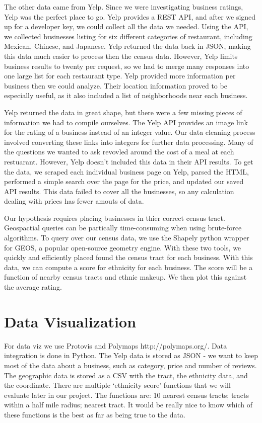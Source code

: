 \documentclass[11pt,twocolumn]{article}
\begin{document}
The other data came from Yelp. Since we were investigating business ratings, Yelp was the perfect place to go. Yelp provides a REST API, and after we signed up for a developer key, we could collect all the data we needed. Using the API, we collected businesses listing for six different categories of restaurant, including Mexican, Chinese, and Japanese. Yelp returned the data back in JSON, making this data much easier to process then the census data. However, Yelp limits business results to twenty per request, so we had to merge many responses into one large list for each restaurant type. Yelp provided more information per business then we could analyze. Their location information proved to be especially useful, as it also included a list of neighborhoods near each business.

Yelp returned the data in great shape, but there were a few missing pieces of information we had to compile ourselves. The Yelp API provides an image link for the rating of a business instead of an integer value. Our data cleaning process involved converting these links into integers for further data processing. Many of the questions we wanted to ask revovled around the cost of a meal at each restuarant. However, Yelp doesn't included this data in their API results. To get the data, we scraped each individual business page on Yelp, parsed the HTML, performed a simple search over the page for the price, and updated our saved API results. This data failed to cover all the businesses, so any calculation dealing with prices has fewer amouts of data.

Our hypothesis requires placing businesses in thier correct census tract. Geospactial queries can be partically time-consuming when using brute-force algorithms. To query over our census data, we use the Shapely python wrapper for GEOS, a popular open-source geometry engine. With these two tools, we quickly and efficiently placed found the census tract for each business. With this data, we can compute a score for ethnicity for each business. The score will be a function of nearby census tracts and ethnic makeup. We then plot this against the average rating.

\section{Data Visualization}

For data viz we use Protovis and Polymaps http://polymaps.org/. Data integration is done in Python. The Yelp data is stored as JSON - we want to keep most of the data about a business, such as category, price and number of reviews. The geographic data is stored as a CSV with the tract, the ethnicity data, and the coordinate. There are multiple ‘ethnicity score’ functions that we will evaluate later in our project. The functions are: 10 nearest census tracts; tracts within a half mile radius; nearest tract. It would be really nice to know which of these functions is the best as far as being true to the data.
\end{document}
